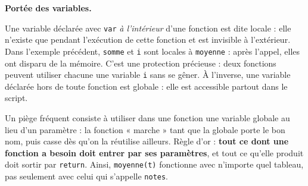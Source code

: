 \documentclass[11pt]{article}
\newcommand{\cle}[1]{{\popxbold\color{popdark}#1}}
\begin{document}
\textbf{Portée des variables.}\par
Une variable déclarée avec \texttt{var} \emph{à l'intérieur} d'une fonction est dite \cle{locale} : elle n'existe que pendant l'exécution de cette fonction et est invisible à l'extérieur. Dans l'exemple précédent, \texttt{somme} et \texttt{i} sont locales à \texttt{moyenne} : après l'appel, elles ont disparu de la mémoire. C'est une protection précieuse : deux fonctions peuvent utiliser chacune une variable \texttt{i} sans se gêner. À l'inverse, une variable déclarée hors de toute fonction est \cle{globale} : elle est accessible partout dans le script.

\begin{attention}
Un piège fréquent consiste à utiliser dans une fonction une variable globale au lieu d'un paramètre : la fonction « marche » tant que la globale porte le bon nom, puis casse dès qu'on la réutilise ailleurs. Règle d'or : \textbf{tout ce dont une fonction a besoin doit entrer par ses paramètres}, et tout ce qu'elle produit doit sortir par \texttt{return}. Ainsi, \texttt{moyenne(t)} fonctionne avec n'importe quel tableau, pas seulement avec celui qui s'appelle \texttt{notes}.
\end{attention}
\end{document}
